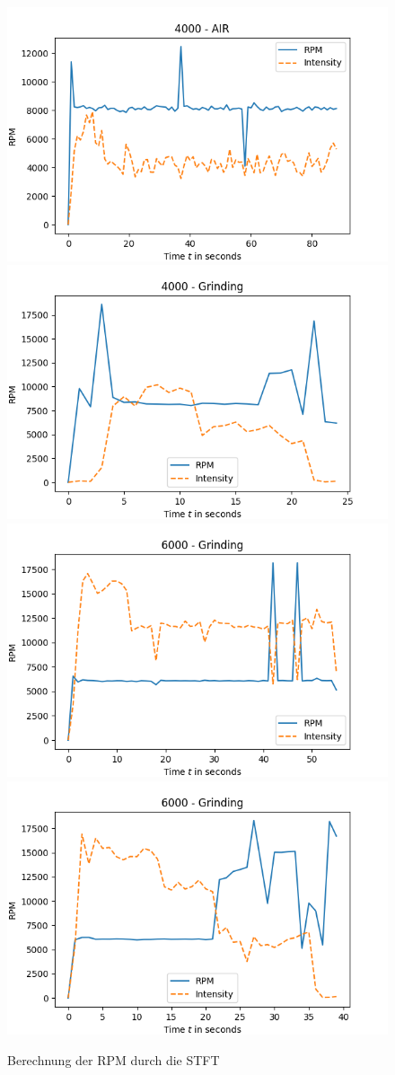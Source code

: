 \begin{figure}[H]
    \includegraphics[width=0.5\linewidth]{Studienarbeit//images/stft-rpm-4000-air.png}    
    \includegraphics[width=0.5\linewidth]{Studienarbeit//images/stft-rpm-4000-grinding.png}
    \includegraphics[width=0.5\linewidth]{Studienarbeit//images/stft-rpm-6000-grinding.png}
    \includegraphics[width=0.5\linewidth]{Studienarbeit//images/stft-rpm-6000-grinding-hard.png}
    \caption{Berechnung der RPM durch die STFT}
    \label{fig:rpm-stft}
\end{figure}

